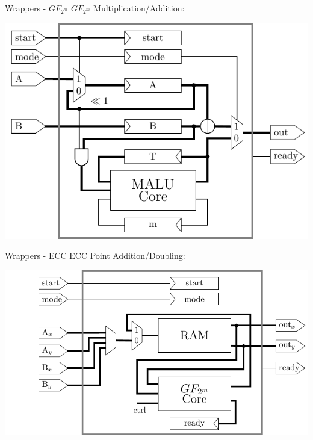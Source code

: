\documentclass{beamer}
\begin{document}
\begin{frame}{Wrappers - $GF_{2^m}$}
	$GF_{2^m}$ Multiplication/Addition:\\
	\begin{center}
		\includegraphics[height=0.55\paperheight]{images/malu-wrapper-gf2m}
	\end{center}
\end{frame}

\begin{frame}{Wrappers - ECC}
	ECC Point Addition/Doubling:\\
	\begin{center}
		\includegraphics[height=0.55\paperheight]{images/malu-wrapper-ecc}
	\end{center}
\end{frame}
\end{document}

